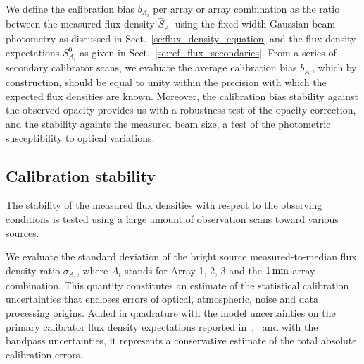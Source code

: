 We define the calibration bias $b_{A_i}$ per array or array combination as
the ratio between the measured flux density $\hat{S}_{A_i}$ using the
fixed-width Gaussian beam photometry as discussed in
Sect.~\ref{se:flux_density_equation} and the flux density expectations $S^{0}_{A_i}$ as
given in Sect.~\ref{se:ref_flux_secondaries}. From a series of
secondary calibrator scans, we evaluate the average calibration bias
$b_{A_i}$, which by construction, should be equal to
unity within the precision with which the expected flux densities are
known. Moreover, the calibration bias stability against the observed
opacity provides us with a robustness test of the opacity correction,
and the stability againts the measured beam size, a test of the
photometric susceptibility to optical variations.

\subsection{Calibration stability}

The stability of the measured flux densities with respect to the observing
conditions is tested using a large amount of observation scans toward
various sources.


We evaluate the standard deviation of the bright source measured-to-median flux
density ratio $\sigma_{A_i}$, where $A_i$ stands for Array 1, 2, 3
and the $1\,\rm{mm}$ array combination. 
This quantity constitutes an estimate of the statistical calibration
uncertainties that encloses errors of optical, atmospheric, noise and
data processing origins.
Added in quadrature with the model uncertainties on the primary
calibrator flux density expectations reported
in~\cite{Morenothesis},~\cite{bendo2013} and with the bandpass
uncertainties, it represents a
conservative estimate of the total absolute calibration errors.
